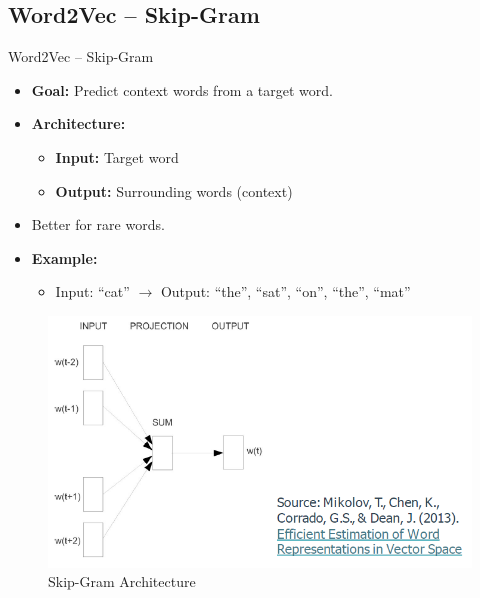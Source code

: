 \subsection{Word2Vec – Skip-Gram}
\begin{frame}[allowframebreaks]{Word2Vec – Skip-Gram}
    \begin{itemize}
        \item \textbf{Goal:} Predict context words from a target word.
        \item \textbf{Architecture:}
        \begin{itemize}
            \item \textbf{Input:} Target word
            \item \textbf{Output:} Surrounding words (context)
        \end{itemize}
        \item Better for rare words.
        \item \textbf{Example:}
        \begin{itemize}
            \item Input: ``cat'' $\rightarrow$ Output: ``the'', ``sat'', ``on'', ``the'', ``mat''
        \end{itemize}
    \end{itemize}
\framebreak
    \begin{figure}
        \centering
        \includegraphics[width=\textwidth,height=0.8\textheight,keepaspectratio]{images/vector-space/skipgram-1.png}
        \caption{Skip-Gram Architecture}
    \end{figure}
\framebreak
    \begin{figure}
        \centering
    \end{figure}
\end{frame}


